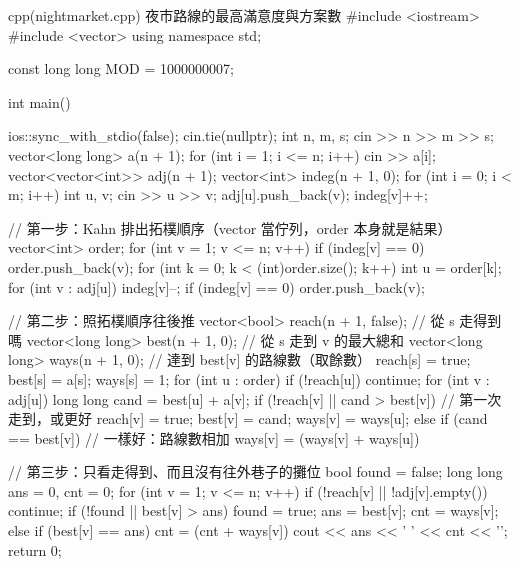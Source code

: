 \begin{example}[label=ex:nightmarket]{cpp}{(nightmarket.cpp) 夜市路線的最高滿意度與方案數}
#include <iostream>
#include <vector>
using namespace std;

const long long MOD = 1000000007;

int main() {
    ios::sync_with_stdio(false);
    cin.tie(nullptr);
    int n, m, s;
    cin >> n >> m >> s;
    vector<long long> a(n + 1);
    for (int i = 1; i <= n; i++) {
        cin >> a[i];
    }
    vector<vector<int>> adj(n + 1);
    vector<int> indeg(n + 1, 0);
    for (int i = 0; i < m; i++) {
        int u, v;
        cin >> u >> v;
        adj[u].push_back(v);
        indeg[v]++;
    }

    // 第一步：Kahn 排出拓樸順序（vector 當佇列，order 本身就是結果）
    vector<int> order;
    for (int v = 1; v <= n; v++) {
        if (indeg[v] == 0) {
            order.push_back(v);
        }
    }
    for (int k = 0; k < (int)order.size(); k++) {
        int u = order[k];
        for (int v : adj[u]) {
            indeg[v]--;
            if (indeg[v] == 0) {
                order.push_back(v);
            }
        }
    }

    // 第二步：照拓樸順序往後推
    vector<bool> reach(n + 1, false);   // 從 s 走得到嗎
    vector<long long> best(n + 1, 0);   // 從 s 走到 v 的最大總和
    vector<long long> ways(n + 1, 0);   // 達到 best[v] 的路線數（取餘數）
    reach[s] = true;
    best[s] = a[s];
    ways[s] = 1;
    for (int u : order) {
        if (!reach[u]) {
            continue;
        }
        for (int v : adj[u]) {
            long long cand = best[u] + a[v];
            if (!reach[v] || cand > best[v]) {      // 第一次走到，或更好
                reach[v] = true;
                best[v] = cand;
                ways[v] = ways[u];
            } else if (cand == best[v]) {           // 一樣好：路線數相加
                ways[v] = (ways[v] + ways[u]) %
            }
        }
    }

    // 第三步：只看走得到、而且沒有往外巷子的攤位
    bool found = false;
    long long ans = 0, cnt = 0;
    for (int v = 1; v <= n; v++) {
        if (!reach[v] || !adj[v].empty()) {
            continue;
        }
        if (!found || best[v] > ans) {
            found = true;
            ans = best[v];
            cnt = ways[v];
        } else if (best[v] == ans) {
            cnt = (cnt + ways[v]) %
        }
    }
    cout << ans << ' ' << cnt << '\n';
    return 0;
}
\end{example}


